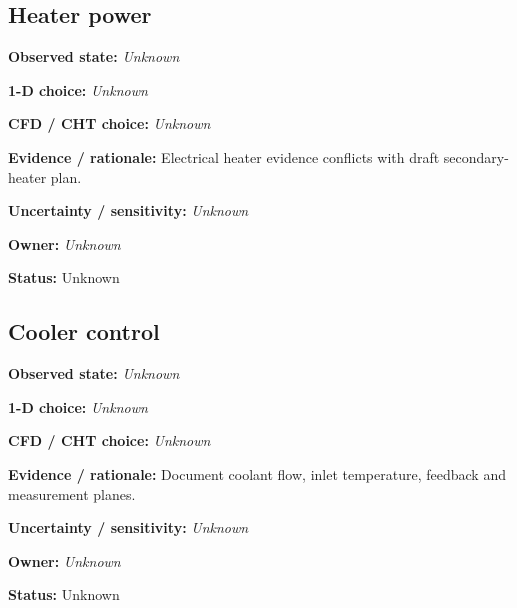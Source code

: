 \documentclass[11pt]{article}
\begin{document}
\par\noindent\begin{minipage}{\textwidth}\small\setlength{\parskip}{2pt}
\subsection*{Heater power}
\textbf{Observed state:} \textit{Unknown}\par
\textbf{1-D choice:} \textit{Unknown}\par
\textbf{CFD / CHT choice:} \textit{Unknown}\par
\textbf{Evidence / rationale:} Electrical heater evidence conflicts with draft secondary-heater plan.\par
\textbf{Uncertainty / sensitivity:} \textit{Unknown}\par
\textbf{Owner:} \textit{Unknown}\par
\textbf{Status:} Unknown\par
\end{minipage}\par\vspace{5pt}
\par\noindent\begin{minipage}{\textwidth}\small\setlength{\parskip}{2pt}
\subsection*{Cooler control}
\textbf{Observed state:} \textit{Unknown}\par
\textbf{1-D choice:} \textit{Unknown}\par
\textbf{CFD / CHT choice:} \textit{Unknown}\par
\textbf{Evidence / rationale:} Document coolant flow, inlet temperature, feedback and measurement planes.\par
\textbf{Uncertainty / sensitivity:} \textit{Unknown}\par
\textbf{Owner:} \textit{Unknown}\par
\textbf{Status:} Unknown\par
\end{minipage}\par\vspace{5pt}
\end{document}
